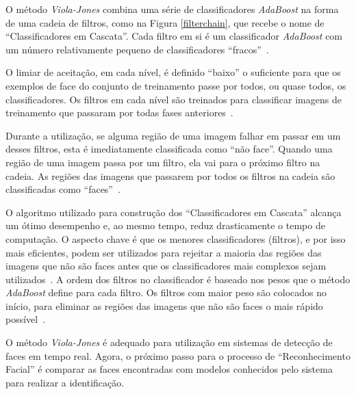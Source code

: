 	O método \textit{Viola-Jones} combina uma série de classificadores
	\textit{AdaBoost} na forma de uma cadeia de filtros, como na Figura
	\ref{filterchain}, que recebe o nome de ``Classificadores em Cascata''. Cada
	filtro em si é um classificador \textit{AdaBoost} com um número relativamente
	pequeno de classificadores ``fracos''~\cite{servodetection}.
	
	O limiar de aceitação, em cada nível, é definido ``baixo'' o suficiente para
	que os exemplos de face do conjunto de treinamento passe por todos, ou quase
	todos, os classificadores. Os filtros em cada nível são treinados para
	classificar imagens de treinamento que passaram por todas fases
	anteriores~\cite{servodetection}.
	
	Durante a utilização, se alguma região de uma imagem falhar em passar em um
	desses filtros, esta é imediatamente classificada como ``não face''. Quando uma
	região de uma imagem passa por um filtro, ela vai para o próximo filtro na
	cadeia. As regiões das imagens que passarem por todos os filtros na cadeia são
	classificadas como ``faces''~\cite{servodetection}.
	
	O algoritmo utilizado para construção dos ``Classificadores em Cascata'' alcança
	um ótimo desempenho e, ao mesmo tempo, reduz drasticamente o tempo de
	computação. O aspecto chave é que os menores classificadores (filtros), e por
	isso mais eficientes, podem ser utilizados para rejeitar a maioria das regiões
	das imagens que não são faces antes que os classificadores mais complexos sejam
	utilizados~\cite{violajones}. A ordem dos filtros no classificador é baseado nos
	pesos que o método \textit{AdaBoost} define para cada filtro. Os filtros com
	maior peso são colocados no início, para eliminar as regiões das imagens que não
	são faces o mais rápido possível~\cite{servodetection}.
	
	O método \textit{Viola-Jones} é adequado para utilização em sistemas de detecção
	de faces em tempo real. Agora, o próximo passo para o processo de
	``Reconhecimento Facial'' é comparar as faces encontradas com modelos conhecidos
	pelo sistema para realizar a identificação.


